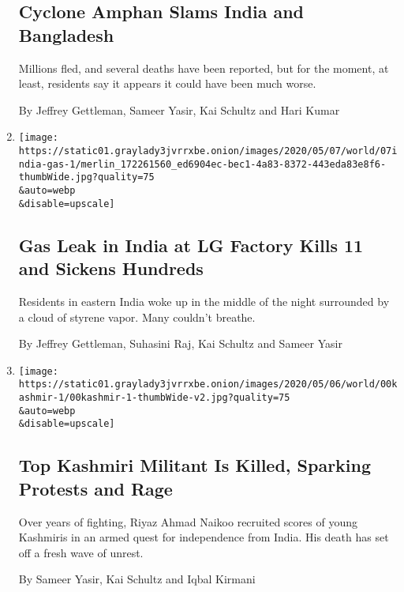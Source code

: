 \begin{enumerate}
  \hypertarget{cyclone-amphan-slams-india-and-bangladesh}{%
  \subsection{Cyclone Amphan Slams India and
  Bangladesh}\label{cyclone-amphan-slams-india-and-bangladesh}}

  Millions fled, and several deaths have been reported, but for the
  moment, at least, residents say it appears it could have been much
  worse.

  By Jeffrey Gettleman, Sameer Yasir, Kai Schultz and Hari Kumar
\item
  \href{/2020/05/07/world/asia/india-lg-gas.html}{}

  \texttt{[image: https://static01.graylady3jvrrxbe.onion/images/2020/05/07/world/07india-gas-1/merlin\_172261560\_ed6904ec-bec1-4a83-8372-443eda83e8f6-thumbWide.jpg?quality=75\\\&auto=webp\\\&disable=upscale]}

  \hypertarget{gas-leak-in-india-at-lg-factory-kills-11-and-sickens-hundreds}{%
  \subsection{Gas Leak in India at LG Factory Kills 11 and Sickens
  Hundreds}\label{gas-leak-in-india-at-lg-factory-kills-11-and-sickens-hundreds}}

  Residents in eastern India woke up in the middle of the night
  surrounded by a cloud of styrene vapor. Many couldn't breathe.

  By Jeffrey Gettleman, Suhasini Raj, Kai Schultz and Sameer Yasir
\item
  \href{/2020/05/06/world/asia/india-pakistan-kashmir-riyaz-ahmad-naikoo.html}{}

  \texttt{[image: https://static01.graylady3jvrrxbe.onion/images/2020/05/06/world/00kashmir-1/00kashmir-1-thumbWide-v2.jpg?quality=75\\\&auto=webp\\\&disable=upscale]}

  \hypertarget{top-kashmiri-militant-is-killed-sparking-protests-and-rage}{%
  \subsection{Top Kashmiri Militant Is Killed, Sparking Protests and
  Rage}\label{top-kashmiri-militant-is-killed-sparking-protests-and-rage}}

  Over years of fighting, Riyaz Ahmad Naikoo recruited scores of young
  Kashmiris in an armed quest for independence from India. His death has
  set off a fresh wave of unrest.

  By Sameer Yasir, Kai Schultz and Iqbal Kirmani
\end{enumerate}

